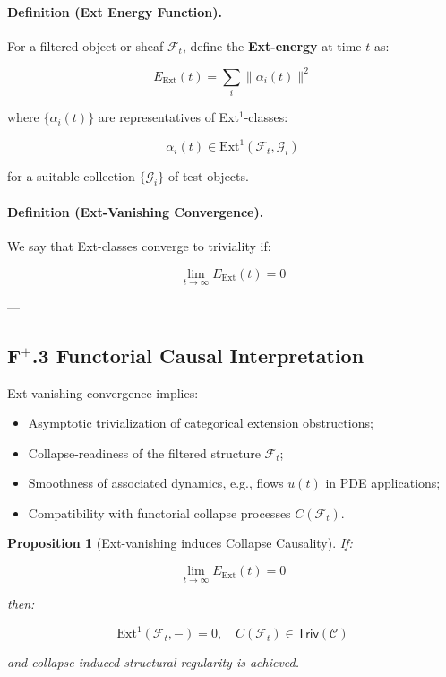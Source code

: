 \documentclass[11pt]{article}
\newtheorem{proposition}[theorem]{Proposition}
\begin{document}
\paragraph{Definition (Ext Energy Function).}

For a filtered object or sheaf $\mathcal{F}_t$, define the \textbf{Ext-energy} at time $t$ as:

\[
E_{\mathrm{Ext}}(t) = \sum_{i} \| \alpha_i(t) \|^2
\]

where $\{ \alpha_i(t) \}$ are representatives of Ext$^1$-classes:

\[
\alpha_i(t) \in \mathrm{Ext}^1(\mathcal{F}_t, \mathcal{G}_i)
\]

for a suitable collection $\{ \mathcal{G}_i \}$ of test objects.

\paragraph{Definition (Ext-Vanishing Convergence).}

We say that Ext-classes converge to triviality if:

\[
\lim_{t \to \infty} E_{\mathrm{Ext}}(t) = 0
\]

---

\subsection*{F$^{+}$.3 Functorial Causal Interpretation}

Ext-vanishing convergence implies:

\begin{itemize}
    \item Asymptotic trivialization of categorical extension obstructions;
    \item Collapse-readiness of the filtered structure $\mathcal{F}_t$;
    \item Smoothness of associated dynamics, e.g., flows $u(t)$ in PDE applications;
    \item Compatibility with functorial collapse processes $C(\mathcal{F}_t)$.
\end{itemize}

\begin{proposition}[Ext-vanishing induces Collapse Causality]
If:

\[
\lim_{t \to \infty} E_{\mathrm{Ext}}(t) = 0
\]

then:

\[
\mathrm{Ext}^1(\mathcal{F}_t, -) = 0, \quad C(\mathcal{F}_t) \in \mathsf{Triv}(\mathcal{C})
\]

and collapse-induced structural regularity is achieved.
\end{proposition}
\end{document}
